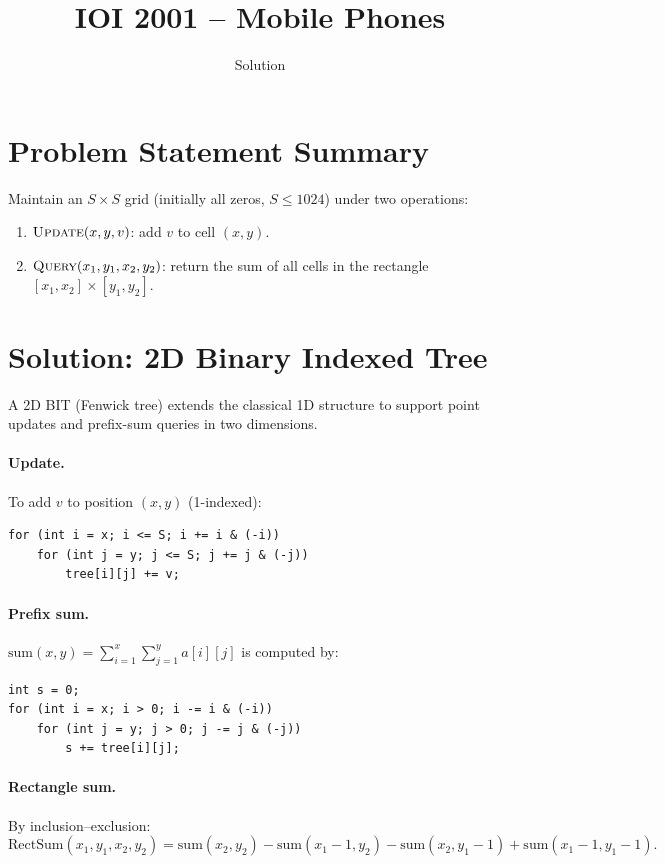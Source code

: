 \documentclass[11pt,a4paper]{article}
\title{IOI 2001 -- Mobile Phones}
\author{Solution}
\date{}
\begin{document}
\maketitle

\section{Problem Statement Summary}
Maintain an $S \times S$ grid (initially all zeros, $S \le 1024$)
under two operations:
\begin{enumerate}
  \item $\textsc{Update}(x, y, v)$: add $v$ to cell $(x, y)$.
  \item $\textsc{Query}(x_1, y_1, x_2, y_2)$: return the sum of all cells
        in the rectangle $[x_1, x_2] \times [y_1, y_2]$.
\end{enumerate}

\section{Solution: 2D Binary Indexed Tree}

A 2D BIT (Fenwick tree) extends the classical 1D structure to support
point updates and prefix-sum queries in two dimensions.

\paragraph{Update.} To add $v$ to position $(x, y)$ (1-indexed):
\begin{lstlisting}[numbers=none,frame=none]
for (int i = x; i <= S; i += i & (-i))
    for (int j = y; j <= S; j += j & (-j))
        tree[i][j] += v;
\end{lstlisting}

\paragraph{Prefix sum.}
$\displaystyle\mathrm{sum}(x, y) = \sum_{i=1}^{x}\sum_{j=1}^{y} a[i][j]$
is computed by:
\begin{lstlisting}[numbers=none,frame=none]
int s = 0;
for (int i = x; i > 0; i -= i & (-i))
    for (int j = y; j > 0; j -= j & (-j))
        s += tree[i][j];
\end{lstlisting}

\paragraph{Rectangle sum.} By inclusion--exclusion:
\[
  \mathrm{RectSum}(x_1,y_1,x_2,y_2)
  = \mathrm{sum}(x_2,y_2)
  - \mathrm{sum}(x_1{-}1,y_2)
  - \mathrm{sum}(x_2,y_1{-}1)
  + \mathrm{sum}(x_1{-}1,y_1{-}1).
\]
\end{document}
